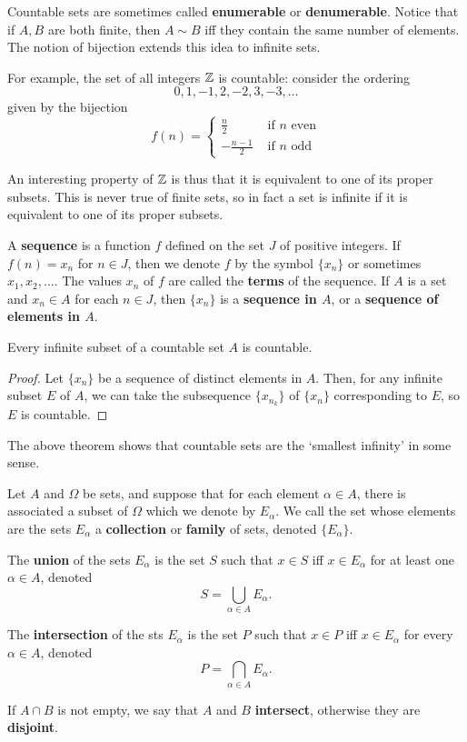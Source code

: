 \begin{definition}
Countable sets are sometimes called \textbf{enumerable} or \textbf{denumerable}. Notice that if $A, B$ are both finite, then $A \sim B$ iff they contain the same number of elements. The notion of bijection extends this idea to infinite sets.
\end{definition}

For example, the set of all integers $\mathbb{Z}$ is countable: consider the ordering
\[
	0, 1, -1, 2, -2, 3, -3, \dotsc
\]
given by the bijection
\[
	f(n) = \begin{cases}
		\frac{n}{2} & \text{ if $n$ even} \\
		-\frac{n-1}{2} & \text{ if $n$ odd}
		\end{cases}
\]

An interesting property of $\mathbb{Z}$ is thus that it is equivalent to one of its proper subsets. This is never true of finite sets, so in fact a set is infinite if it is equivalent to one of its proper subsets. 

\begin{definition}
A \textbf{sequence} is a function $f$ defined on the set $J$ of positive integers. If $f(n) = x_n$ for $n \in J$, then we denote $f$ by the symbol $\{x_n\}$ or sometimes $x_1, x_2, \dotsc$. The values $x_n$ of $f$ are called the \textbf{terms} of the sequence. If $A$ is a set and $x_n \in A$ for each $n \in J$, then $\{x_n\}$ is a \textbf{sequence in $A$}, or a \textbf{sequence of elements in $A$}.
\end{definition}

\begin{theorem}
Every infinite subset of a countable set $A$ is countable. 

\begin{proof}
Let $\{x_n\}$ be a sequence of distinct elements in $A$. Then, for any infinite subset $E$ of $A$, we can take the subsequence $\{x_{n_k}\}$ of $\{x_n\}$ corresponding to $E$, so $E$ is countable.
\end{proof}
\end{theorem}

The above theorem shows that countable sets are the `smallest infinity' in some sense. 

\begin{definition}
Let $A$ and $\Omega$ be sets, and suppose that for each element $\alpha \in A$, there is associated a subset of $\Omega$ which we denote by $E_{\alpha}$. We call the set whose elements are the sets $E_{\alpha}$ a \textbf{collection} or \textbf{family} of sets, denoted $\{E_\alpha\}$. 

The \textbf{union} of the sets $E_\alpha$ is the set $S$ such that $x \in S$ iff $x \in E_\alpha$ for at least one $\alpha \in A$, denoted
\[
	S = \bigcup_{\alpha \in A}{E_\alpha}.
\]

The \textbf{intersection} of the sts $E_{\alpha}$ is the set $P$ such that $x \in P$ iff $x \in E_\alpha$ for every $\alpha \in A$, denoted
\[
	P = \bigcap_{\alpha \in A}{E_\alpha}.
\]

If $A \cap B$ is not empty, we say that $A$ and $B$ \textbf{intersect}, otherwise they are \textbf{disjoint}.
\end{definition}

